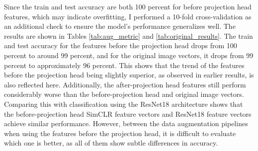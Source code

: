Since the train and test accuracy are both 100 percent for before projection head features, which may indicate overfitting, I performed a 10-fold cross-validation as an additional check to ensure the model's performance generalizes well. The results are shown in Tables \ref{tab:aug_metric} and \ref{tab:original_results}. The train and test accuracy for the features before the projection head drops from 100 percent to around 99 percent, and for the original image vectors, it drops from 99 percent to approximately 96 percent. This shows that the trend of the features before the projection head being slightly superior, as observed in earlier results, is also reflected here. Additionally, the after-projection head features still perform considerably worse than the before-projection head and original image vectors. Comparing this with classification using the ResNet18 architecture shows that the before-projection head SimCLR feature vectors and ResNet18 feature vectors achieve similar performance. However, between the data augmentation pipelines when using the features before the projection head, it is difficult to evaluate which one is better, as all of them show subtle differences in accuracy.
\begin{table}[H]
    \centering
    \caption{Classification performance metrics for different augmentation strategies before and after the projection head using cross validation with 10 k folds}
    \label{tab:aug_metric}
\end{table}

